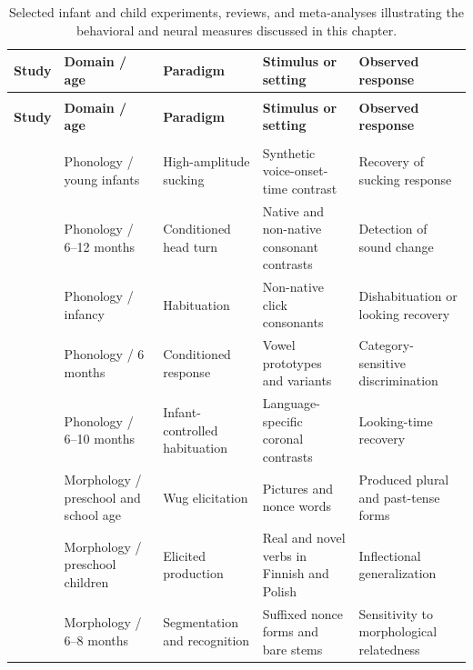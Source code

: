 \begingroup
\scriptsize
\setlength{\tabcolsep}{3pt}
\begin{longtable}{@{}>{\raggedright\arraybackslash}p{}>{\raggedright\arraybackslash}p{}>{\raggedright\arraybackslash}p{}>{\raggedright\arraybackslash}p{}>{\raggedright\arraybackslash}p{}@{}}
\caption[Selected studies of language development]{Selected infant and child experiments, reviews, and meta-analyses illustrating the behavioral and neural measures discussed in this chapter.}\label{tab:litreview:child-studies}\\
\toprule
\textbf{Study} & \textbf{Domain / age} & \textbf{Paradigm} & \textbf{Stimulus or setting} & \textbf{Observed response} \\
\midrule
\endfirsthead
\multicolumn{5}{@{}l}{\scriptsize Table~\ref{tab:litreview:child-studies} continued}\\
\toprule
\textbf{Study} & \textbf{Domain / age} & \textbf{Paradigm} & \textbf{Stimulus or setting} & \textbf{Observed response} \\
\midrule
\endhead
\midrule
\multicolumn{5}{r@{}}{\scriptsize Continued on next page}\\
\endfoot
\bottomrule
\endlastfoot
\citep{Eimas1971} & Phonology / young infants & High-amplitude sucking & Synthetic voice-onset-time contrast & Recovery of sucking response \\
\citep{Werker1984} & Phonology / 6--12 months & Conditioned head turn & Native and non-native consonant contrasts & Detection of sound change \\
\citep{Best1988} & Phonology / infancy & Habituation & Non-native click consonants & Dishabituation or looking recovery \\
\citep{Kuhl1992} & Phonology / 6 months & Conditioned response & Vowel prototypes and variants & Category-sensitive discrimination \\
\citep{Sundara2018} & Phonology / 6--10 months & Infant-controlled habituation & Language-specific coronal contrasts & Looking-time recovery \\
\citep{BerkoGleason1958} & Morphology / preschool and school age & Wug elicitation & Pictures and nonce words & Produced plural and past-tense forms \\
\citep{engelmann2019input} & Morphology / preschool children & Elicited production & Real and novel verbs in Finnish and Polish & Inflectional generalization \\
\citep{kim2021morphology} & Morphology / 6--8 months & Segmentation and recognition & Suffixed nonce forms and bare stems & Sensitivity to morphological relatedness \\

\end{longtable}
